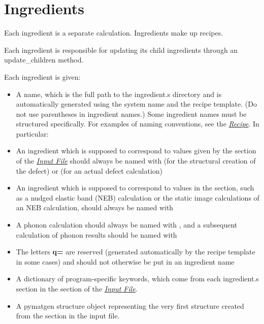 \documentclass[letterpaper,10pt,english]{sphinxmanual}
\begin{document}
\chapter{Ingredients}
\label{2_0_ingredients::doc}\label{2_0_ingredients:ingredients}
Each ingredient is a separate calculation. Ingredients make up recipes.

Each ingredient is responsible for updating its child ingredients through an update\_children method.

Each ingredient is given:
\begin{itemize}
\item {} 
A name, which is the full path to the ingredient.s directory and is automatically generated using the system name and the recipe template. (Do not use parentheses in ingredient names.) Some ingredient names must be structured specifically. For examples of naming conventions, see the {\hyperref[4_0_recipe::doc]{\emph{Recipe}}}. In particular:

\item {} 
An ingredient which is supposed to correspond to values given by the  section of the {\hyperref[3_0_inputfile::doc]{\emph{Input File}}} should always be named with  (for the structural creation of the defect) or  (for an actual defect calculation)

\item {} 
An ingredient which is supposed to correspond to values in the  section, such as a nudged elastic band (NEB) calculation or the static image calculations of an NEB calculation, should always be named with 

\item {} 
A phonon calculation should always be named with , and a subsequent calculation of phonon results should be named with 

\item {} 
The letters \textbf{q=} are reserved (generated automatically by the recipe template in some cases) and should not otherwise be put in an ingredient name

\item {} 
A dictionary of program-specific keywords, which come from each ingredient.s section in the  section of the {\hyperref[3_0_inputfile::doc]{\emph{Input File}}}.

\item {} 
A pymatgen structure object representing the very first structure created from the  section in the input file.


\end{itemize}
\end{document}
